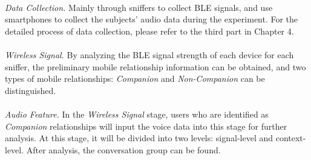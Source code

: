 \documentclass[a4paper,12pt]{report}
\begin{document}
\paragraph{}
\emph{Data Collection.} Mainly through sniffers to collect BLE signals, and use smartphones to collect the subjects' audio data during the experiment. For the detailed process of data collection, please refer to the third part in Chapter 4.

\paragraph{}
\emph{Wireless Signal.} By analyzing the BLE signal strength of each device for each sniffer, the preliminary mobile relationship information can be obtained, and two types of mobile relationships: \emph{Companion} and \emph{Non-Companion} can be distinguished.

\paragraph{}
\emph{Audio Feature.} In the \emph{Wireless Signal} stage, users who are identified as \emph{Companion} relationships will input the voice data into this stage for further analysis. At this stage, it will be divided into two levels: signal-level and context-level. After analysis, the conversation group can be found.
\end{document}
